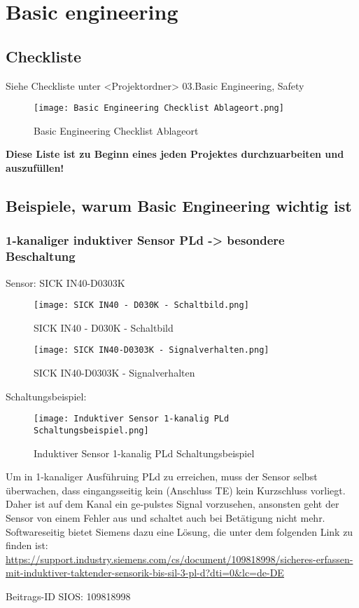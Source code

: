 \section{Basic engineering}
\subsection{Checkliste}
Siehe Checkliste unter <Projektordner> 03.Basic Engineering, Safety

\begin{figure}[!ht]
    \centering
    \texttt{[image: Basic Engineering Checklist Ablageort.png]}
    \caption{Basic Engineering Checklist Ablageort}
    \label{fig:Basic Engineering Checklist Ablageort}
\end{figure} 


\textbf{Diese Liste ist zu Beginn eines jeden Projektes durchzuarbeiten und auszufüllen!}

\clearpage
\subsection{Beispiele, warum Basic Engineering wichtig ist}
\subsubsection{1-kanaliger induktiver Sensor PLd -> besondere Beschaltung}
Sensor: SICK IN40-D0303K

\begin{figure}[!ht]
    \centering
    \texttt{[image: SICK IN40 - D030K - Schaltbild.png]}
    \caption{SICK IN40 - D030K - Schaltbild}
    \label{fig:SICK IN40 - D030K - Schaltbild}
\end{figure} 

\begin{figure}[!ht]
    \centering
    \texttt{[image: SICK IN40-D0303K - Signalverhalten.png]}
    \caption{SICK IN40-D0303K - Signalverhalten}
    \label{fig:SICK IN40-D0303K - Signalverhalten}
\end{figure} 
\clearpage
Schaltungsbeispiel:

\begin{figure}[!ht]
    \centering
    \texttt{[image: Induktiver Sensor 1-kanalig PLd Schaltungsbeispiel.png]}
    \caption{Induktiver Sensor 1-kanalig PLd Schaltungsbeispiel}
    \label{fig:Induktiver Sensor 1-kanalig PLd Schaltungsbeispiel}
\end{figure}

Um in 1-kanaliger Ausführuing PLd zu erreichen, muss der Sensor selbst überwachen, dass eingangsseitig kein (Anschluss TE) kein Kurzschluss vorliegt. Daher ist auf dem Kanal ein ge-pulstes Signal vorzusehen, ansonsten geht der Sensor von einem Fehler aus und schaltet auch bei Betätigung nicht mehr.
Softwareseitig bietet Siemens dazu eine Lösung, die unter dem folgenden Link zu finden ist:
\url{https://support.industry.siemens.com/cs/document/109818998/sicheres-erfassen-mit-induktiver-taktender-sensorik-bis-sil-3-pl-d?dti=0&lc=de-DE}

Beitrags-ID SIOS: 109818998